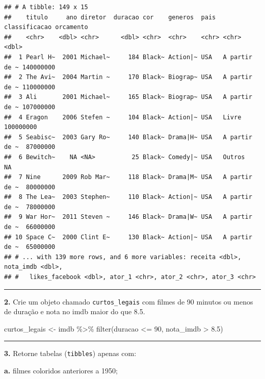 \documentclass[
]{book}
\newenvironment{Shaded}{\begin{snugshade}}{\end{snugshade}}
\newcommand{\DecValTok}[1]{\textcolor[rgb]{0.00,0.00,0.81}{#1}}
\newcommand{\FloatTok}[1]{\textcolor[rgb]{0.00,0.00,0.81}{#1}}
\newcommand{\FunctionTok}[1]{\textcolor[rgb]{0.00,0.00,0.00}{#1}}
\newcommand{\NormalTok}[1]{#1}
\newcommand{\OtherTok}[1]{\textcolor[rgb]{0.56,0.35,0.01}{#1}}
\newcommand{\SpecialCharTok}[1]{\textcolor[rgb]{0.00,0.00,0.00}{#1}}
\begin{document}
\begin{verbatim}
## # A tibble: 149 x 15
##    titulo     ano diretor  duracao cor    generos  pais  classificacao orcamento
##    <chr>    <dbl> <chr>      <dbl> <chr>  <chr>    <chr> <chr>             <dbl>
##  1 Pearl H~  2001 Michael~     184 Black~ Action|~ USA   A partir de ~ 140000000
##  2 The Avi~  2004 Martin ~     170 Black~ Biograp~ USA   A partir de ~ 110000000
##  3 Ali       2001 Michael~     165 Black~ Biograp~ USA   A partir de ~ 107000000
##  4 Eragon    2006 Stefen ~     104 Black~ Action|~ USA   Livre         100000000
##  5 Seabisc~  2003 Gary Ro~     140 Black~ Drama|H~ USA   A partir de ~  87000000
##  6 Bewitch~    NA <NA>          25 Black~ Comedy|~ USA   Outros               NA
##  7 Nine      2009 Rob Mar~     118 Black~ Drama|M~ USA   A partir de ~  80000000
##  8 The Lea~  2003 Stephen~     110 Black~ Action|~ USA   A partir de ~  78000000
##  9 War Hor~  2011 Steven ~     146 Black~ Drama|W~ USA   A partir de ~  66000000
## 10 Space C~  2000 Clint E~     130 Black~ Action|~ USA   A partir de ~  65000000
## # ... with 139 more rows, and 6 more variables: receita <dbl>, nota_imdb <dbl>,
## #   likes_facebook <dbl>, ator_1 <chr>, ator_2 <chr>, ator_3 <chr>
\end{verbatim}

\begin{center}\rule{0.5\linewidth}{0.5pt}\end{center}

\textbf{2.} Crie um objeto chamado \texttt{curtos\_legais} com filmes de 90 minutos ou menos de duração e nota no imdb maior do que 8.5.

\begin{Shaded}
\begin{Highlighting}[]
\NormalTok{curtos\_legais }\OtherTok{\textless{}{-}}\NormalTok{ imdb }\SpecialCharTok{\%\textgreater{}\%} 
  \FunctionTok{filter}\NormalTok{(duracao }\SpecialCharTok{\textless{}=} \DecValTok{90}\NormalTok{, nota\_imdb }\SpecialCharTok{\textgreater{}} \FloatTok{8.5}\NormalTok{)}
\end{Highlighting}
\end{Shaded}

\begin{center}\rule{0.5\linewidth}{0.5pt}\end{center}

\textbf{3.} Retorne tabelas (\texttt{tibbles}) apenas com:

\textbf{a.} filmes coloridos anteriores a 1950;
\end{document}
